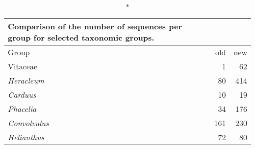 \documentclass{article}
\begin{document}
\begin{longtabu}{XRR}
\caption*{Comparison of the number of sequences per group for selected taxonomic groups.}\\
\toprule
Group & old & new \\
\midrule
\endhead
Vitaceae & 1 & 62 \\
\textit{Heracleum} & 80 & 414 \\
\textit{Carduus} & 10 & 19 \\
\textit{Phacelia} & 34 & 176 \\
\textit{Convolvulus} & 161 & 230 \\
\textit{Helianthus} & 72 & 80 \\
\bottomrule
\end{longtabu}
\end{document}
